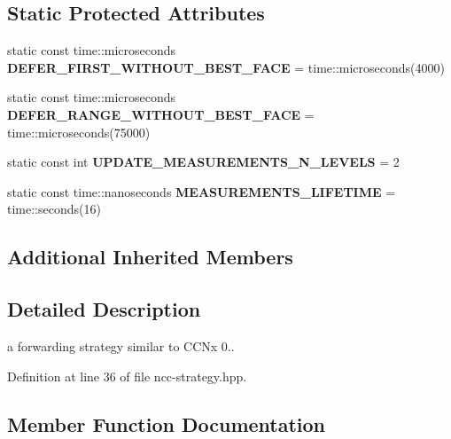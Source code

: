 \subsection*{Static Protected Attributes}
\begin{DoxyCompactItemize}
\item 
static const time\+::microseconds {\bfseries D\+E\+F\+E\+R\+\_\+\+F\+I\+R\+S\+T\+\_\+\+W\+I\+T\+H\+O\+U\+T\+\_\+\+B\+E\+S\+T\+\_\+\+F\+A\+CE} = time\+::microseconds(4000)\hypertarget{classnfd_1_1fw_1_1NccStrategy_a4f9c123c2b8c1f798de83f6404a180c8}{}\label{classnfd_1_1fw_1_1NccStrategy_a4f9c123c2b8c1f798de83f6404a180c8}

\item 
static const time\+::microseconds {\bfseries D\+E\+F\+E\+R\+\_\+\+R\+A\+N\+G\+E\+\_\+\+W\+I\+T\+H\+O\+U\+T\+\_\+\+B\+E\+S\+T\+\_\+\+F\+A\+CE} = time\+::microseconds(75000)\hypertarget{classnfd_1_1fw_1_1NccStrategy_a3d4249a228f211aa005303ab85b7883f}{}\label{classnfd_1_1fw_1_1NccStrategy_a3d4249a228f211aa005303ab85b7883f}

\item 
static const int {\bfseries U\+P\+D\+A\+T\+E\+\_\+\+M\+E\+A\+S\+U\+R\+E\+M\+E\+N\+T\+S\+\_\+\+N\+\_\+\+L\+E\+V\+E\+LS} = 2\hypertarget{classnfd_1_1fw_1_1NccStrategy_aa34a908c9205b7bb9af412f263f54c3d}{}\label{classnfd_1_1fw_1_1NccStrategy_aa34a908c9205b7bb9af412f263f54c3d}

\item 
static const time\+::nanoseconds {\bfseries M\+E\+A\+S\+U\+R\+E\+M\+E\+N\+T\+S\+\_\+\+L\+I\+F\+E\+T\+I\+ME} = time\+::seconds(16)\hypertarget{classnfd_1_1fw_1_1NccStrategy_a8358bba681a9df31000d57071efc6934}{}\label{classnfd_1_1fw_1_1NccStrategy_a8358bba681a9df31000d57071efc6934}

\end{DoxyCompactItemize}
\subsection*{Additional Inherited Members}


\subsection{Detailed Description}
a forwarding strategy similar to C\+C\+Nx 0.. 

Definition at line 36 of file ncc-\/strategy.\+hpp.



\subsection{Member Function Documentation}
